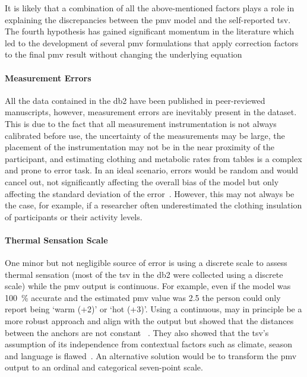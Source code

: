 It is likely that a combination of all the above-mentioned factors plays a role in explaining the discrepancies between the \ac{pmv} model and the self-reported \ac{tsv}.
The fourth hypothesis has gained significant momentum in the literature which led to the development of several \ac{pmv} formulations that apply correction factors to the final \ac{pmv} result without changing the underlying equation~\cite{Yao2022, Toftum2002}

\paragraph{Measurement Errors}
All the data contained in the \ac{db2} have been published in peer-reviewed manuscripts, however, measurement errors are inevitably present in the dataset.
This is due to the fact that all measurement instrumentation is not always calibrated before use, the uncertainty of the measurements may be large, the placement of the instrumentation may not be in the near proximity of the participant, and estimating clothing and metabolic rates from tables is a complex and prone to error task.
In an ideal scenario, errors would be random and would cancel out, not significantly affecting the overall bias of the model but only affecting the standard deviation of the error~\cite{Humphreys2002}.
However, this may not always be the case, for example, if a researcher often underestimated the clothing insulation of participants or their activity levels.

\paragraph{Thermal Sensation Scale}
One minor but not negligible source of error is using a discrete scale to assess thermal sensation (most of the \ac{tsv} in the \ac{db2} were collected using a discrete scale) while the \ac{pmv} output is continuous.
For example, even if the model was 100~\% accurate and the estimated \ac{pmv} value was \num{2.5} the person could only report being `warm (+2)' or `hot (+3)'.
Using a continuous, may in principle be a more robust approach and align with the output but  showed that the distances between the anchors are not constant ~\cite{schweiker2019scales, schweiker2020evaluating}. 
They also showed that the \ac{tsv}'s assumption of its independence from contextual factors such as climate, season and language is flawed~\cite{schweiker2019scales, schweiker2020evaluating}.
An alternative solution would be to transform the \ac{pmv} output to an ordinal and categorical seven-point scale. 

